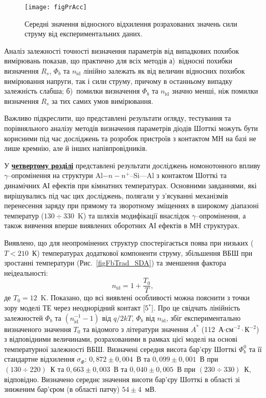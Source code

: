 \begin{figure}
\center
\texttt{[image: figPrAcc]}%
\caption{\label{figPrAcc}
Середні значення відносного відхилення розрахованих значень сили струму від експериментальних даних.
}
\end{figure}


Аналіз залежності точності визначення параметрів від випадкових похибок вимірювань показав, що практично для всіх методів
а)~відносні похибки визначення $R_s$, $\Phi_b$ та $n_\mathrm{id}$ лінійно залежать як від величин відносних похибок вимірювання напруги, так і сили струму, причому в останньому випадку залежність слабша;
б)~помилки визначення $\Phi_b$ та $n_\mathrm{id}$ значно менші, ніж помилки визначення $R_s$ за тих самих умов вимірювання.

Важливо підкреслити, що представлені результати огляду, тестування та порівняльного аналізу методів визначення параметрів діодів Шотткі можуть бути корисними під час досліджень та розробок пристроїв з контактом МН на базі не лише кремнію, але й інших напівпровідників.


У  \underline{\textbf{четвертому розділі}} представлені результати досліджень
номонотонного впливу $\gamma$--опромінення на структури Al$-n-n^+$--Si---Al з контактом Шотткі та
динамічних АІ ефектів при кімнатних температурах.
Основними завданнями, які вирішувались під час цих досліджень, полягали у з'ясуванні механізмів перенесення заряду при прямому та
    зворотному зміщеннях в широкому діапазоні температур ($130\div330$~K) та шляхів модифікації внаслідок $\gamma$--опромінення, а також вивчення вперше виявлених
    оборотних АІ ефектів в МН структурах.

Виявлено, що для неопромінених структур спостерігається поява при низьких ($T<210$~К) температурах додаткової компоненти струму,
збільшення ВБШ при зростанні температури (Рис.~\ref{figFbTrad_SDA}) та зменшення фактора неідеальності:
\begin{equation}\label{eqN_T:TE}
n_{\mathrm{id}}=1+\frac{T_0}{T},
\end{equation}
де $T_0=12$~K.
Показано, що всі виявлені особливості можна пояснити з точки зору моделі ТЕ через неоднорідний контакт
[5$^*$].
Про це свідчать лінійність залежностей $\Phi_{b}$ та $(n_{\mathrm{id}}^{-1}-1)$ від $q/2kT$, $\Phi_{b}$ від $n_{\mathrm{id}}$,
збіг експериментально визначеного значення $T_0$  та відомого з літератури значення $A^*$ (112~А$\cdot$см$^{-2}\cdot$К$^{-2}$) з відповідними величинами,
розрахованими в рамках цієї моделі на основі температурної залежності ВБШ.
       Визначені середня висота бар'єру Шотткі $\Phi_b^0$ та її стандартне відхилення $\sigma_{\Phi}$:
       $0,872\pm0,004$~В та $0,099\pm0,001$~В при $(130\div220)$~К та
       $0,663\pm0,003$~В та $0,040\pm0,005$~В при $(230\div330)$~К, відповідно.
Визначено середнє значення висоти бар'єру Шотткі в області зі зниженим бар'єром (в області патчу) $54\pm4$~мВ.

